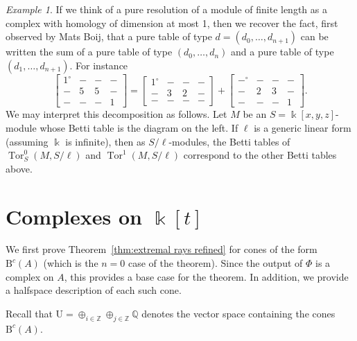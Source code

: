 \documentclass[12pt]{amsart}
\theoremstyle{definition}
\theoremstyle{remark}
\newtheorem{example}[lemma]{Example}
\newcommand{\Tor}{\operatorname{Tor}}
\newcommand{\kk}{\Bbbk}
\newcommand{\ZZ}{\mathbb{Z}}
\newcommand{\QQ}{\mathbb{Q}}
\newcommand{\UU}{\mathrm{U}}
\newcommand{\cc}{c}
\newcommand{\zp}{\circ}
\newcommand{\BBQ}{\mathrm{B}}
\begin{document}
\begin{example}
If we think of a pure resolution of a module of finite length as a complex with homology of dimension at most 1, then we recover the fact, first observed by Mats Boij, that a pure table of type $d=(d_0, \dots, d_{n+1})$ can be written the sum of a pure table of type $(d_0, \dots, d_n)$ and a  pure table of type $(d_1, \dots, d_{n+1})$.  For instance
\[
\begin{bmatrix}
1^{\zp}&-&-&-\\
-&5&5&-\\
-&-&-&1
\end{bmatrix}
=
\begin{bmatrix}
1^{\zp}&-&-&-\\
-&3&2&-\\
-&-&-&-
\end{bmatrix}
+
\begin{bmatrix}
-^{\zp}&-&-&-\\
-&2&3&-\\
-&-&-&1
\end{bmatrix}.
\]
We may interpret this decomposition as follows.  Let $M$ be an $S=\kk[x,y,z]$-module whose Betti table is the diagram on the left. If $\ell$ is a generic linear form (assuming $\kk$ is infinite), then as $S/\ell$-modules, the Betti tables of $\Tor^0_S(M,S/\ell)$ and $\Tor^1(M,S/\ell)$ correspond to the other Betti tables above.
\end{example}






\section{Complexes on $\kk[t]$}\label{sec:A}
We first prove Theorem~\ref{thm:extremal rays refined} for cones of the form $\BBQ^{\cc}(A)$ (which is the $n=0$ case of the theorem).
Since the output of $\Phi$ is a complex on $A$, this provides a base case for the theorem.  In addition, we provide a halfspace description of each such cone.

Recall that $\UU= \oplus_{i\in \ZZ} \oplus_{j\in \ZZ}\QQ$  denotes the vector space containing the cones $\BBQ^{\cc}(A)$. 
\end{document}
